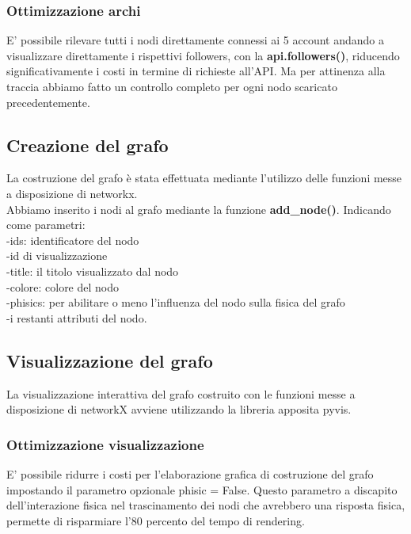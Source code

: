 \documentclass[a4paper,11pt]{report}
\begin{document}
\subsubsection{Ottimizzazione archi}
E' possibile rilevare tutti i nodi direttamente connessi ai 5 account andando a visualizzare direttamente i rispettivi followers, con la \textbf{api.followers()}, riducendo significativamente i costi in termine di richieste all'API. Ma per attinenza alla traccia abbiamo fatto un controllo completo per ogni nodo scaricato precedentemente.
\subsection{Creazione del grafo}
La costruzione del grafo è stata effettuata mediante l'utilizzo delle funzioni messe a disposizione di networkx. 
\\
Abbiamo inserito i nodi al grafo mediante la funzione \textbf{add\_node()}. Indicando come parametri:\\
-ids: identificatore del nodo\\
-id di visualizzazione\\
-title: il titolo visualizzato dal nodo\\
-colore: colore del nodo\\
-phisics: per abilitare o meno l'influenza del nodo sulla fisica del grafo\\
-i restanti attributi del nodo.\\
\subsection{Visualizzazione del grafo}
La visualizzazione interattiva del grafo costruito con le funzioni messe a disposizione di networkX avviene utilizzando la libreria apposita pyvis.
\subsubsection{Ottimizzazione visualizzazione}
E' possibile ridurre i costi per l'elaborazione grafica di costruzione del grafo impostando il parametro opzionale phisic = False. Questo parametro a discapito dell'interazione fisica nel trascinamento  dei nodi che avrebbero una risposta fisica, permette di risparmiare l'80 percento del tempo di rendering.

\pagebreak
\end{document}
